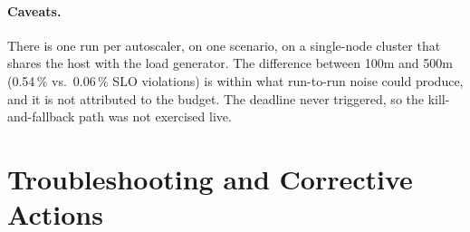 \documentclass[11pt,a4paper]{article}
\begin{document}
\paragraph{Caveats.} There is one run per autoscaler, on one scenario, on a single-node cluster that shares the
host with the load generator. The difference between 100m and 500m (0.54\,\% vs.\ 0.06\,\% SLO violations)
is within what run-to-run noise could produce, and it is not attributed to the budget. The deadline never
triggered, so the kill-and-fallback path was not exercised live.


\section{Troubleshooting and Corrective Actions}
\end{document}
